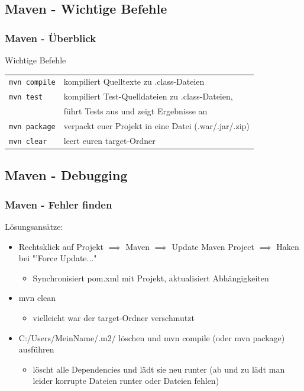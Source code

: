 \documentclass[18pt]{beamer}
\begin{document}
	\subsection{Maven - Wichtige Befehle}
	\begin{frame}
		\frametitle{Maven - Überblick}
		\begin{block}{Wichtige Befehle}
			\begin{tabular}{ll}
				\texttt{mvn compile} & kompiliert Quelltexte zu .class-Dateien \\
				\texttt{mvn test} & kompiliert Test-Quelldateien zu .class-Dateien, \\ & führt Tests aus und zeigt Ergebnisse an \\
				\texttt{mvn package} & verpackt euer Projekt in eine Datei (.war/.jar/.zip) \\ 
				\texttt{mvn clear} & leert euren target-Ordner \\
			\end{tabular}
		\end{block}
	\end{frame}
	
	\subsection{Maven - Debugging}
	\begin{frame}
		\frametitle{Maven - Fehler finden}
		Lösungsansätze:
		\begin{itemize}
			\item Rechtsklick auf Projekt $\implies$ Maven $\implies$ Update Maven Project $\implies$ Haken bei "'Force Update..." 
			\begin{itemize}
				\item Synchronisiert pom.xml mit Projekt, aktualisiert Abhängigkeiten
			\end{itemize}
			\item mvn clean
			\begin{itemize}
				\item vielleicht war der target-Ordner verschmutzt
			\end{itemize}
			\item C:/Users/MeinName/.m2/ löschen und mvn compile (oder mvn package) ausführen
			\begin{itemize}
				\item löscht alle Dependencies und lädt sie neu runter (ab und zu lädt man leider korrupte Dateien runter oder Dateien fehlen)
			\end{itemize}
		\end{itemize}
	\end{frame}
	
\end{document}
